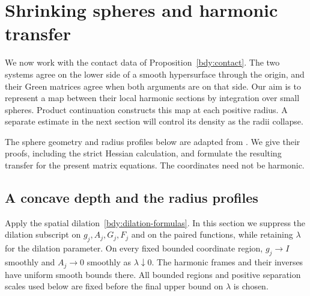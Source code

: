 \section{Shrinking spheres and harmonic transfer}
\label{sec:spheres}\label{sph:section}

We now work with the contact data of Proposition~\ref{bdy:contact}.
The two systems agree on the lower side of a smooth hypersurface
through the origin, and their Green matrices agree when both arguments
are on that side.  Our aim is to represent a map between their local
harmonic sections by integration over small spheres.  Product
continuation constructs this map at each positive radius.  A separate
estimate in the next section will control its density as the radii
collapse.

The sphere geometry and radius profiles below are adapted from
\cite[Section~4]{ScalarCompanion2026}.  We give their proofs, including
the strict Hessian calculation, and formulate the resulting transfer
for the present matrix equations.  The coordinates need not be harmonic.

\subsection{A concave depth and the radius profiles}

Apply the spatial dilation~\eqref{bdy:dilation-formulas}.  In this section we
suppress the dilation subscript on $g_j,A_j,G_j,F_j$ and on the paired
functions, while retaining $\lambda$ for the dilation parameter.
On every fixed bounded coordinate region, $g_j\to I$ smoothly and
$A_j\to0$ smoothly as $\lambda\downarrow0$.  The harmonic frames and
their inverses have uniform smooth bounds there.  All bounded regions
and positive separation scales used below are fixed before the final
upper bound on $\lambda$ is chosen.

